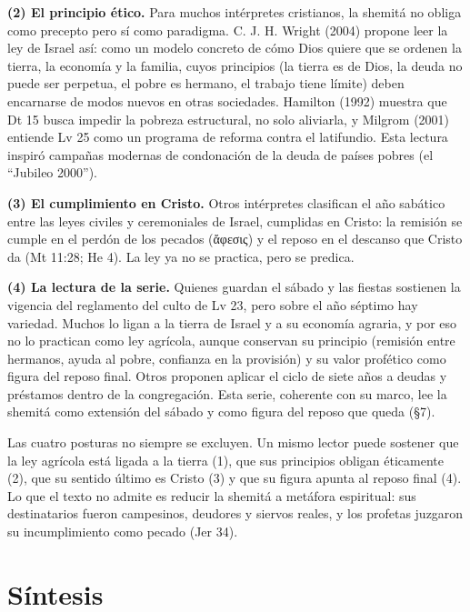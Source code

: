 \documentclass[11pt,letterpaper]{article}
\newcommand{\grc}[1]{\foreignlanguage{ancientgreek}{#1}}
\begin{document}
\textbf{(2) El principio ético.} Para muchos intérpretes cristianos, la shemitá no obliga como precepto pero sí como paradigma. C. J. H. Wright (2004) propone leer la ley de Israel así: como un modelo concreto de cómo Dios quiere que se ordenen la tierra, la economía y la familia, cuyos principios (la tierra es de Dios, la deuda no puede ser perpetua, el pobre es hermano, el trabajo tiene límite) deben encarnarse de modos nuevos en otras sociedades. Hamilton (1992) muestra que Dt 15 busca impedir la pobreza estructural, no solo aliviarla, y Milgrom (2001) entiende Lv 25 como un programa de reforma contra el latifundio. Esta lectura inspiró campañas modernas de condonación de la deuda de países pobres (el ``Jubileo 2000'').

\textbf{(3) El cumplimiento en Cristo.} Otros intérpretes clasifican el año sabático entre las leyes civiles y ceremoniales de Israel, cumplidas en Cristo: la remisión se cumple en el perdón de los pecados (\grc{ἄφεσις}) y el reposo en el descanso que Cristo da (Mt 11:28; He 4). La ley ya no se practica, pero se predica.

\textbf{(4) La lectura de la serie.} Quienes guardan el sábado y las fiestas sostienen la vigencia del reglamento del culto de Lv 23, pero sobre el año séptimo hay variedad. Muchos lo ligan a la tierra de Israel y a su economía agraria, y por eso no lo practican como ley agrícola, aunque conservan su principio (remisión entre hermanos, ayuda al pobre, confianza en la provisión) y su valor profético como figura del reposo final. Otros proponen aplicar el ciclo de siete años a deudas y préstamos dentro de la congregación. Esta serie, coherente con su marco, lee la shemitá como extensión del sábado y como figura del reposo que queda (§7).

\begin{nota}[Precisión]
Las cuatro posturas no siempre se excluyen. Un mismo lector puede sostener que la ley agrícola está ligada a la tierra (1), que sus principios obligan éticamente (2), que su sentido último es Cristo (3) y que su figura apunta al reposo final (4). Lo que el texto no admite es reducir la shemitá a metáfora espiritual: sus destinatarios fueron campesinos, deudores y siervos reales, y los profetas juzgaron su incumplimiento como pecado (Jer 34).
\end{nota}

\section{Síntesis}
\end{document}
